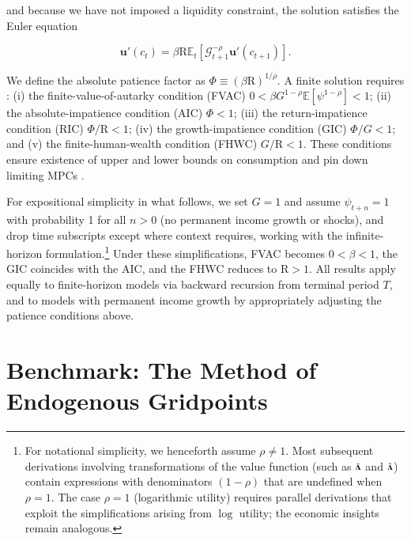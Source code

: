 \documentclass[twocolumn, switch]{article}
\newcommand{\Ex}{\mathbf{\mathbb{E}}}
\newcommand{\DiscFac}{\beta}
\newcommand{\uFunc}{\mathbf{u}}
\newcommand{\CRRA}{\rho}
\newcommand{\cNrm}{c}
\newcommand{\Rfree}{\text{R}}
\newcommand{\PermGroShk}{\mathcal{G}}
\newcommand{\PermGroFac}{G}
\newcommand{\permShk}{\psi}
\newcommand{\uPrime}{\uFunc'}
\newcommand{\AbsPatFac}{\Phi}
\newcommand{\vInv}{{\scriptsize \boldsymbol{\Lambda}}}
\newcommand{\vInvOpt}{\bar{\vInv}}
\newcommand{\vInvReal}{\hat{\vInv}}
\begin{document}
and because we have not imposed a liquidity constraint, the solution satisfies
the Euler equation

\begin{equation}
\label{eq:cEuler}
\uPrime(\cNrm_{t}) = \DiscFac \Rfree \Ex_{t}[ \PermGroShk_{t+1}^{-\CRRA} \uPrime(\cNrm_{t+1})].
\end{equation}

We define the absolute patience factor as $\AbsPatFac\equiv(\DiscFac\Rfree)^{1/\CRRA}$. A finite solution requires \citep{CarrollShanker2024}: (i) the finite-value-of-autarky condition (FVAC) $0<\DiscFac\PermGroFac^{1 -\CRRA}\Ex[\permShk^{1 -\CRRA}]<1$; (ii) the absolute-impatience condition (AIC) $\AbsPatFac<1$; (iii) the return-impatience condition (RIC) $\AbsPatFac/\Rfree<1$; (iv) the growth-impatience condition (GIC) $\AbsPatFac/\PermGroFac<1$; and (v) the finite-human-wealth condition (FHWC) $\PermGroFac/\Rfree<1$. These conditions ensure existence of upper and lower bounds on consumption \citep{Carroll2001MPCBound, StachurskiToda2019JET} and pin down limiting MPCs \citep{MaToda2021SavingRateRich}.

For expositional simplicity in what follows, we set $\PermGroFac=1$ and assume $\permShk_{t+n}=1$ with probability 1 for all $n>0$ (no permanent income growth or shocks), and drop time subscripts except where context requires, working with the infinite-horizon formulation.\footnote{For notational simplicity, we henceforth assume $\CRRA \neq 1$. Most subsequent derivations involving transformations of the value function (such as $\vInvOpt$ and $\vInvReal$) contain expressions with denominators $(1 -\CRRA)$ that are undefined when $\CRRA=1$. The case $\CRRA=1$ (logarithmic utility) requires parallel derivations that exploit the simplifications arising from $\log$ utility; the economic insights remain analogous.} Under these simplifications, FVAC becomes $0<\DiscFac<1$, the GIC coincides with the AIC, and the FHWC reduces to $\Rfree>1$. All results apply equally to finite-horizon models via backward recursion from terminal period $T$, and to models with permanent income growth by appropriately adjusting the patience conditions above.

\section{Benchmark: The Method of Endogenous Gridpoints}\label{benchmark-the-method-of-endogenous-gridpoints}
\end{document}
